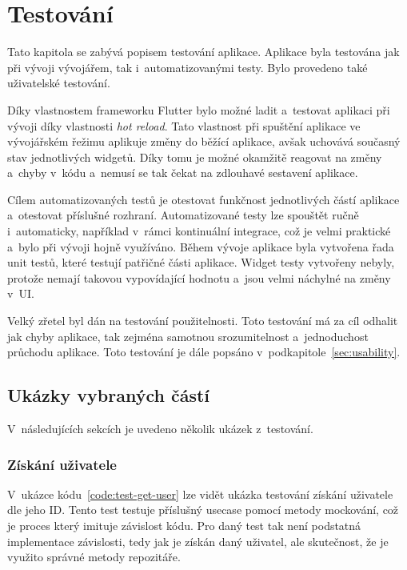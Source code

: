 \chapter{Testování}
\label{chap:testing}

Tato kapitola se zabývá popisem testování aplikace.
Aplikace byla testována jak při vývoji vývojářem,
tak i~automatizovanými testy.
Bylo provedeno také uživatelské testování.

Díky vlastnostem frameworku Flutter bylo možné ladit a~testovat aplikaci
při vývoji díky vlastnosti \emph{hot reload}.
Tato vlastnost při spuštění aplikace ve vývojářském řežimu
aplikuje změny do běžící aplikace,
avšak uchovává současný stav jednotlivých widgetů.
Díky tomu je možné okamžitě reagovat na změny a~chyby v~kódu
a~nemusí se tak čekat na zdlouhavé sestavení aplikace.

Cílem automatizovaných testů je otestovat funkčnost jednotlivých částí aplikace
a~otestovat příslušné rozhraní.
Automatizované testy lze spouštět ručně i~automaticky,
například v~rámci kontinuální integrace,
což je velmi praktické a~bylo při vývoji hojně využíváno.
Během vývoje aplikace byla vytvořena řada unit testů,
které testují patřičné části aplikace.
Widget testy vytvořeny nebyly,
protože nemají takovou vypovídající hodnotu a~jsou velmi náchylné na změny v~UI.

Velký zřetel byl dán na testování použitelnosti.
Toto testování má za cíl odhalit jak chyby aplikace,
tak zejména samotnou srozumitelnost a~jednoduchost průchodu aplikace.
Toto testování je dále popsáno v~podkapitole~\ref{sec:usability}.

\section{Ukázky vybraných částí}

V~následujících sekcích je uvedeno několik ukázek z~testování.

\subsection{Získání uživatele}

V~ukázce kódu~\ref{code:test-get-user} lze vidět ukázka testování získání
uživatele dle jeho ID.
Tento test testuje příslušný usecase pomocí metody mockování,
což je proces který imituje závislost kódu.
Pro daný test tak není podstatná implementace závislosti,
tedy jak je získán daný uživatel,
ale skutečnost,
že je využito správné metody repozitáře.

